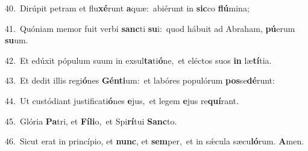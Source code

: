 {\numbfont\textcolor{\numbcolor}{40.}}~Dirúpit petram et flu\-\textbf{xé}\-runt \textbf{a}\-quæ:~\star abiérunt in \textbf{sic}\-co \textbf{flú}\-mina;\par
{\numbfont\textcolor{\numbcolor}{41.}}~Quóniam memor fuit verbi \textbf{sanc}\-ti \textbf{su}\-i:~\star quod hábuit ad Abraham, \textbf{pú}\-erum \textbf{su}\-um.\par
{\numbfont\textcolor{\numbcolor}{42.}}~Et edúxit pópulum suum in exsul\-\textbf{ta}\-ti\-\textbf{ó}\-ne,~\star et eléctos suos \textbf{in} læ\-\textbf{tí}\-tia.\par
{\numbfont\textcolor{\numbcolor}{43.}}~Et dedit illis regi\-\textbf{ó}\-nes \textbf{Gén}\-\textbf{ti}um:~\star et labóres populórum \textbf{pos}\-se\-\textbf{dé}\-runt:\par
{\numbfont\textcolor{\numbcolor}{44.}}~Ut custódiant justificati\-\textbf{ó}\-nes \textbf{e}\-jus,~\star et legem \textbf{e}\-jus re\-\textbf{quí}\-rant.\par
{\numbfont\textcolor{\numbcolor}{45.}}~Glória \textbf{Pa}\-tri, et \textbf{Fí}\-\textbf{li}o,~\star et Spi\-\textbf{rí}\-tui \textbf{Sanc}\-to.\par
{\numbfont\textcolor{\numbcolor}{46.}}~Sicut erat in princípio, et \textbf{nunc}\-, et \textbf{sem}\-per,~\star et in sǽcula sæcu\-\textbf{ló}\-rum. \textbf{A}\-men.\par

